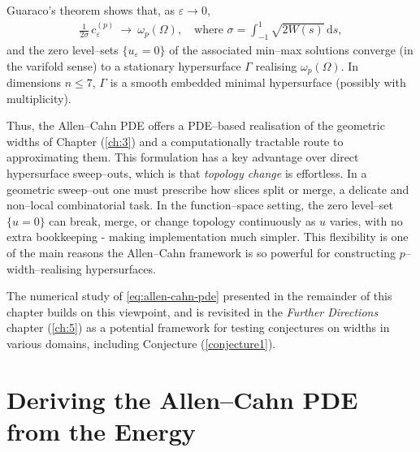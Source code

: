 \noindent Guaraco's theorem shows that, as $\varepsilon \to 0$,
\begin{align*}
\frac{1}{2\sigma} \, c_{\varepsilon}^{(p)} \ \longrightarrow \ \omega_p(\Omega),
\quad \text{where } 
\sigma = \int_{-1}^1 \sqrt{2 W(s)} \,\mathrm{d}s,
\end{align*}
\noindent and the zero level--sets $\{u_{\varepsilon}=0\}$ of the associated min–max solutions converge (in the varifold sense) to a stationary hypersurface $\Gamma$ realising $\omega_p(\Omega)$. In dimensions $n \leq 7$, $\Gamma$ is a smooth embedded minimal hypersurface (possibly with multiplicity).

\noindent Thus, the Allen–Cahn PDE offers a PDE–based realisation of the geometric widths of Chapter (\ref{ch:3}) and a computationally tractable route to approximating them. This formulation has a key advantage over direct hypersurface sweep–outs, which is that \emph{topology change} is effortless. In a geometric sweep–out one must prescribe how slices split or merge, a delicate and non–local combinatorial task. In the function–space setting, the zero level--set $\{u=0\}$ can break, merge, or change topology continuously as $u$ varies, with no extra bookkeeping - making implementation much simpler. This flexibility is one of the main reasons the Allen–Cahn framework is so powerful for constructing $p$–width–realising hypersurfaces.

\noindent The numerical study of \eqref{eq:allen-cahn-pde} presented in the remainder of this chapter builds on this viewpoint, and is revisited in the \emph{Further Directions} chapter (\ref{ch:5}) as a potential framework for testing conjectures on widths in various domains, including Conjecture (\ref{conjecture1}).

\section{Deriving the Allen–Cahn PDE from the Energy}

